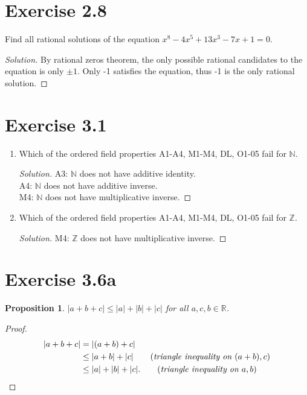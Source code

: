 \documentclass{article}
\newtheorem{proposition}[thm]{Proposition}
\begin{document}
\section*{Exercise 2.8}
Find all rational solutions of the equation $x^8 - 4x^5 + 13x^3 - 7x + 1 =0$.

\begin{proof}[Solution]
    By rational zeros theorem, the only possible rational candidates to the equation is only 
    $\pm 1$. Only -1 satisfies the equation, thus -1 is the only rational solution.
\end{proof}

\section*{Exercise 3.1}
    \begin{enumerate}[label=(\alph*)]
        \item Which of the ordered field properties A1-A4, M1-M4, DL, O1-05 fail for $\mathbb{N}$.
        \begin{proof}[Solution]
            A3: $\mathbb{N}$ does not have additive identity. \\
            A4: $\mathbb{N}$ does not have additive inverse. \\
            M4: $\mathbb{N}$ does not have multiplicative inverse. 
        \end{proof}

        \item Which of the ordered field properties A1-A4, M1-M4, DL, O1-05 fail for $\mathbb{Z}$.
        \begin{proof}[Solution]
            M4: $\mathbb{Z}$ does not have multiplicative inverse.
        \end{proof}
    \end{enumerate}

\section*{Exercise 3.6a}
\begin{proposition}
    $|a+b+c|\le |a|+|b|+|c|$ for all $a,c,b \in \mathbb{R}$.
\end{proposition}
\begin{proof}
    \begin{align*}
        |a+b+c| & = |(a+b)+c| \\
        & \le |a+b| + |c| \qquad (\emph{triangle inequality on } (a +b), c) \\
        & \le |a| + |b| + |c|. \qquad (\emph{triangle inequality on } a, b)
    \end{align*}
\end{proof}
\end{document}
